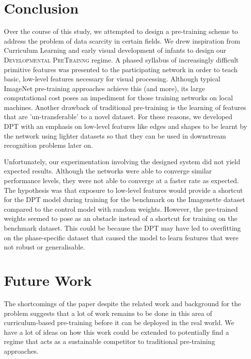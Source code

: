 \section{Conclusion}
Over the course of this study, we attempted to design a pre-training scheme to address the problem of data scarcity in certain fields. We drew inspiration from Curriculum Learning and early visual development of infants to design our \textsc{Developmental PreTrainng} regime. A phased syllabus of increasingly difficult primitive features was presented to the participating network in order to teach basic, low-level features necessary for visual processing. Although typical ImageNet pre-training approaches achieve this (and more), its large computational cost poses an impediment for those training networks on local machines. Another drawback of traditional pre-training is the learning of features that are 'un-transferable' to a novel dataset. For these reasons, we developed DPT with an emphasis on low-level features like edges and shapes to be learnt by the network using lighter datasets so that they can be used in downstream recognition problems later on.

Unfortunately, our experimentation involving the designed system did not yield expected results. Although the networks were able to converge similar performance levels, they were not able to converge at a faster rate as expected. The hypothesis was that exposure to low-level features would provide a shortcut for the DPT model during training for the benchmark on the Imagenette dataset compared to the control model with random weights. However, the pre-trained weights seemed to pose as an obstacle instead of a shortcut for training on the benchmark dataset. This could be because the DPT may have led to overfitting on the phase-specific dataset that caused the model to learn features that were not robust or generalisable.

\section{Future Work}
The shortcomings of the paper despite the related work and background for the problem suggests that a lot of work remains to be done in this area of curriculum-based pre-training before it can be deployed in the real world. We have a lot of ideas on how this work could be extended to potentially find a regime that acts as a sustainable competitor to traditional pre-training approaches.

